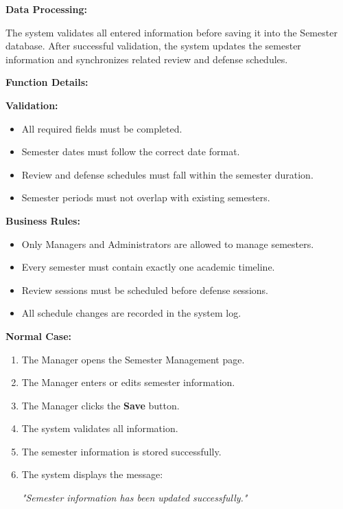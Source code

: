 \vspace{0.2cm}

\textbf{Data Processing:}

The system validates all entered information before saving it into the Semester database. After successful validation, the system updates the semester information and synchronizes related review and defense schedules.

\vspace{0.3cm}

\textbf{Function Details:}

\textbf{Validation:}

\begin{itemize}
    \item All required fields must be completed.
    \item Semester dates must follow the correct date format.
    \item Review and defense schedules must fall within the semester duration.
    \item Semester periods must not overlap with existing semesters.
\end{itemize}

\vspace{0.2cm}

\textbf{Business Rules:}

\begin{itemize}
    \item Only Managers and Administrators are allowed to manage semesters.
    \item Every semester must contain exactly one academic timeline.
    \item Review sessions must be scheduled before defense sessions.
    \item All schedule changes are recorded in the system log.
\end{itemize}

\vspace{0.2cm}

\textbf{Normal Case:}

\begin{enumerate}
    \item The Manager opens the Semester Management page.
    \item The Manager enters or edits semester information.
    \item The Manager clicks the \textbf{Save} button.
    \item The system validates all information.
    \item The semester information is stored successfully.
    \item The system displays the message:

    \textit{"Semester information has been updated successfully."}
\end{enumerate}

